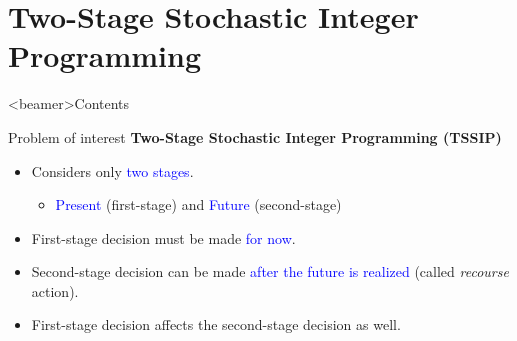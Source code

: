 \documentclass{beamer}
\begin{document}
	\section{Two-Stage Stochastic Integer Programming}
	
	\begin{frame}<beamer>{Contents}
	\end{frame}
	
	\begin{frame}{Problem of interest}
	\textbf{{Two-Stage Stochastic Integer Programming (TSSIP)}}
	\begin{itemize}
		\item Considers only \textcolor{blue}{two stages}.
			\begin{itemize}
				\item \textcolor{blue}{Present} (first-stage) and \textcolor{blue}{Future} (second-stage)
			\end{itemize} 
		\item First-stage decision must be made \textcolor{blue}{for now}.
		\item Second-stage decision can be made \textcolor{blue}{after the future is realized} (called \textit{recourse} action).
		\item First-stage decision affects the second-stage decision as well.
	\end{itemize}
	\end{frame}
	
\end{document}
